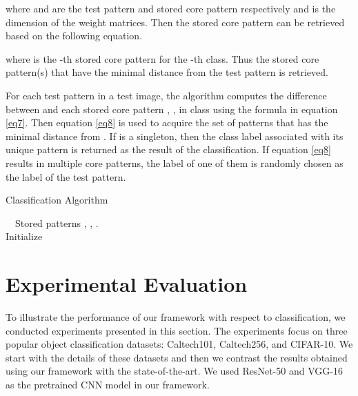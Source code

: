 \documentclass[conference]{IEEEtran}
\newlength\mylen
\newcommand\myinput[1]{\settowidth\mylen{\KwIn{}}\setlength\hangindent{\mylen}\hspace*{\mylen}#1\\}
\begin{document}
where  and  are the test pattern and stored  core pattern respectively and  is the dimension of the weight matrices. Then the stored  core pattern can be  retrieved  based on the following equation.

where  is the -th stored  core pattern for the -th class.  Thus the stored core  pattern(s) that have the minimal distance from the test pattern is  retrieved.  \par

For each test pattern  in  a test image, the algorithm computes the difference between  and  each stored core pattern , ,   in  class   using  the formula in equation \eqref{eq7}. 
Then  equation \eqref{eq8} is used to acquire   the set of patterns   that has the minimal distance from . If  is a singleton, then the class label  associated with its unique pattern is returned  as the result of  the classification. If equation \eqref{eq8} results in multiple core patterns, the label of one of them  is randomly chosen as the label of the test pattern. 

\begin{algorithm}
\caption{Classification Algorithm} \label{alg1}
\myinput{\ \ Stored patterns , , .}
 Initialize  \; 
\;
\eIf{}{
   \;
   \Return \;
   }{
\Return \;
}
\end{algorithm}

\section{Experimental Evaluation}\label{exp}
To  illustrate the performance of our  framework with respect to  classification, we conducted  experiments presented in this section. The experiments   focus on three popular object classification datasets: Caltech101\cite{fei2007learning}, Caltech256\cite{griffin2007caltech}, and CIFAR-10\cite{krizhevsky2009learning}. We start with the  details of these datasets and then we contrast the results obtained using our framework with the state-of-the-art. We used ResNet-50 and VGG-16 as the pretrained CNN model in our  framework.
\end{document}
